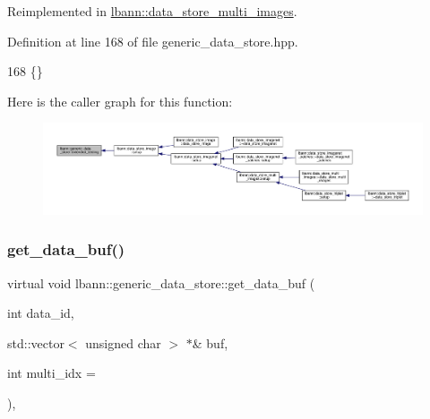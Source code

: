 Reimplemented in \hyperlink{classlbann_1_1data__store__multi__images_abe17bbf485f6da9d7dfa568e9e74a693}{lbann\+::data\+\_\+store\+\_\+multi\+\_\+images}.



Definition at line 168 of file generic\+\_\+data\+\_\+store.\+hpp.


\begin{DoxyCode}
168 \{\}
\end{DoxyCode}
Here is the caller graph for this function\+:\nopagebreak
\begin{figure}[H]
\begin{center}
\leavevmode
\includegraphics[width=350pt]{classlbann_1_1generic__data__store_ae569426f71f9317e88fe1078d58c98e7_icgraph}
\end{center}
\end{figure}
\mbox{\label{classlbann_1_1generic__data__store_a2abb3d0327b528d36e23fcef9b937798}} 
\subsubsection{\texorpdfstring{get\+\_\+data\+\_\+buf()}{get\_data\_buf()}\hspace{0.1cm}{\footnotesize\ttfamily [1/2]}}
{\footnotesize\ttfamily virtual void lbann\+::generic\+\_\+data\+\_\+store\+::get\+\_\+data\+\_\+buf (\begin{DoxyParamCaption}\item[{int}]{data\+\_\+id,  }\item[{std\+::vector$<$ unsigned char $>$ $\ast$\&}]{buf,  }\item[{int}]{multi\+\_\+idx = {} }\end{DoxyParamCaption})\hspace{0.3cm}{\ttfamily [inline]}, {\ttfamily [virtual]}}



